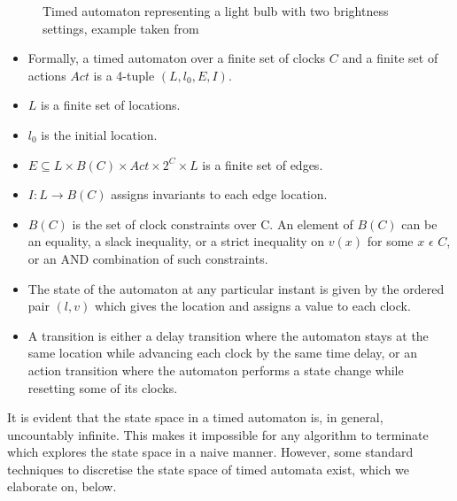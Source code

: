 \documentclass{article}
\begin{document}
\begin{SCfigure}
  \centering

  \caption{Timed automaton representing a light bulb with two
    brightness settings, example taken from \cite{aceto2007reactive}}
\end{SCfigure}

\begin{itemize}
\item Formally, a timed automaton over a finite set of clocks $C$
  and a finite set of actions $Act$ is a 4-tuple $(L, l_{0}, E, I)$.
\item $L$ is a finite set of locations.
\item $l_{0}$ is the initial location.
\item $E \subseteq L \times B(C) \times Act \times 2^{C} \times L$
  is a finite set of edges.
\item $I: L \rightarrow B(C)$ assigns invariants to each edge
  location.
\item $B(C)$ is the set of clock constraints over C. An element of $B(C)$
  can be an equality, a slack inequality, or a strict inequality on
  $v(x)$ for some $x$ $\epsilon$ $C$, or
  an AND combination of such constraints.
\item The state of the automaton at any particular instant is given
  by the ordered pair $(l, v)$ which gives the location and assigns
  a value to each clock. 
\item A transition is either a delay transition where the automaton
  stays at the same location while advancing each clock by the same
  time delay, or an action transition where the automaton performs a
  state change while resetting some of its clocks.
\end{itemize}

It is evident that the state space in a timed automaton is, in
general, uncountably infinite. This makes it impossible for any
algorithm to terminate which explores the state space in a naive
manner. However, some standard techniques to discretise the state
space of timed automata exist, which we elaborate on, below.
\end{document}
